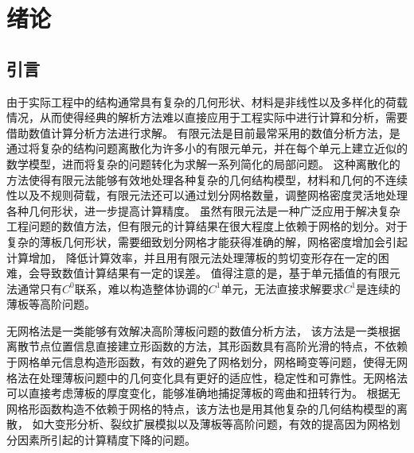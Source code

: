 \chapter{绪论}
\section{引言}
由于实际工程中的结构通常具有复杂的几何形状、材料是非线性以及多样化的荷载情况，从而使得经典的解析方法难以直接应用于工程实际中进行计算和分析，需要借助数值计算分析方法进行求解。
有限元法\textsuperscript{\cite{hughes2000,2014Computer,steinEncyclopediaComputationalMechanics2018,2013Nonlinear}}是目前最常采用的数值分析方法，是通过将复杂的结构问题离散化为许多小的有限元单元，并在每个单元上建立近似的数学模型，进而将复杂的问题转化为求解一系列简化的局部问题。
这种离散化的方法使得有限元法能够有效地处理各种复杂的几何结构模型，材料和几何的不连续性以及不规则荷载，有限元法还可以通过划分网格数量，调整网格密度灵活地处理各种几何形状，进一步提高计算精度。
虽然有限元法是一种广泛应用于解决复杂工程问题的数值方法，但有限元的计算结果在很大程度上依赖于网格的划分。对于复杂的薄板几何形状，需要细致划分网格才能获得准确的解，网格密度增加会引起计算增加， 降低计算效率，并且用有限元法处理薄板的剪切变形存在一定的困难，会导致数值计算结果有一定的误差。
值得注意的是，基于单元插值的有限元法通常只有$C^0$联系，难以构造整体协调的$C^1$单元，无法直接求解要求$C^1$是连续的薄板等高阶问题。
\par
无网格法\textsuperscript{\cite{chenMeshfreeMethodsProgress2017,belytschkoMeshlessMethodsOverview1996b}}是一类能够有效解决高阶薄板问题的数值分析方法，
该方法是一类根据离散节点位置信息直接建立形函数的方法，其形函数具有高阶光滑的特点，不依赖于网格单元信息构造形函数，有效的避免了网格划分，网格畸变等问题，使得无网格法在处理薄板问题中的几何变化具有更好的适应性，稳定性和可靠性。无网格法可以直接考虑薄板的厚度变化，能够准确地捕捉薄板的弯曲和扭转行为。
根据无网格形函数构造不依赖于网格的特点，该方法也是用其他复杂的几何结构模型的离散，
如大变形分析\textsuperscript{\cite{陈嵩涛2020几何非线性分析的高效高阶无网格法}}、裂纹扩展模拟\textsuperscript{\cite{GaoXin2018}}以及薄板等高阶问题\textsuperscript{\cite{邓立克2019薄板分析的线性基梯度光滑伽辽金无网格法}}，有效的提高因为网格划分因素所引起的计算精度下降的问题。
